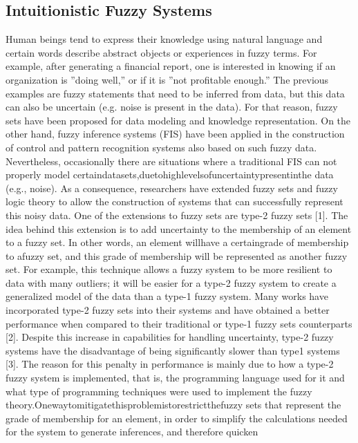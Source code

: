 \subsection{Intuitionistic Fuzzy Systems}
\label{subsection:intuitionistic-fuzzy-systems}

Human beings tend to express their knowledge using natural language and certain
words describe abstract objects or experiences in fuzzy terms. For example,
after generating a ﬁnancial report, one is interested in knowing if an
organization is ”doing well,” or if it is ”not proﬁtable enough.” The previous
examples are fuzzy statements that need to be inferred from data, but this data
can also be uncertain (e.g. noise is present in the data). For that reason,
fuzzy sets have been proposed for data modeling and knowledge representation. On
the other hand, fuzzy inference systems (FIS) have been applied in the
construction of control and pattern recognition systems also based on such fuzzy
data. Nevertheless, occasionally there are situations where a traditional FIS
can not properly model certaindatasets,duetohighlevelsofuncertaintypresentinthe
data (e.g., noise). As a consequence, researchers have extended fuzzy sets and
fuzzy logic theory to allow the construction of systems that can successfully
represent this noisy data. One of the extensions to fuzzy sets are type-2 fuzzy
sets [1]. The idea behind this extension is to add uncertainty to the membership
of an element to a fuzzy set. In other words, an element willhave a certaingrade
of membership to afuzzy set, and this grade of membership will be represented as
another fuzzy set. For example, this technique allows a fuzzy system to be more
resilient to data with many outliers; it will be easier for a type-2 fuzzy
system to create a generalized model of the data than a type-1 fuzzy
system. Many works have incorporated type-2 fuzzy sets into their systems and
have obtained a better performance when compared to their traditional or type-1
fuzzy sets counterparts [2]. Despite this increase in capabilities for handling
uncertainty, type-2 fuzzy systems have the disadvantage of being signiﬁcantly
slower than type1 systems [3]. The reason for this penalty in performance is
mainly due to how a type-2 fuzzy system is implemented, that is, the programming
language used for it and what type of programming techniques were used to
implement the fuzzy theory.Onewaytomitigatethisproblemistorestrictthefuzzy sets
that represent the grade of membership for an element, in order to simplify the
calculations needed for the system to generate inferences, and therefore quicken
